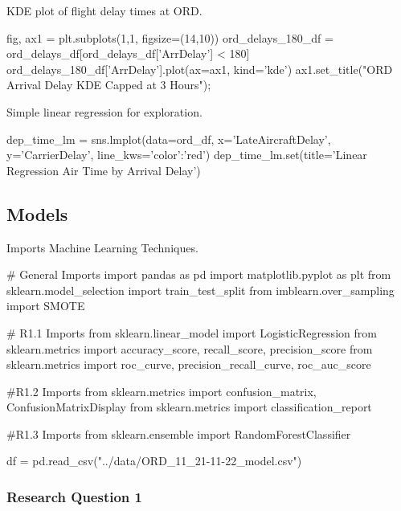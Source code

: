 \documentclass[a4paper,12pt]{article}
\begin{document}
KDE plot of flight delay times at ORD.

\begin{python}

fig, ax1 = plt.subplots(1,1, figsize=(14,10))
ord_delays_180_df = ord_delays_df[ord_delays_df['ArrDelay'] < 180] 
ord_delays_180_df['ArrDelay'].plot(ax=ax1, kind='kde')
ax1.set_title("ORD Arrival Delay KDE Capped at 3 Hours");

\end{python}

Simple linear regression for exploration.

\begin{python}

dep_time_lm = sns.lmplot(data=ord_df, x='LateAircraftDelay', y='CarrierDelay', line_kws={'color':'red'})
dep_time_lm.set(title='Linear Regression Air Time by Arrival Delay')

\end{python}


\subsection{Models}

Imports Machine Learning Techniques.
\begin{python}
# General Imports
import pandas as pd
import matplotlib.pyplot as plt
from sklearn.model_selection import train_test_split
from imblearn.over_sampling import SMOTE

# R1.1 Imports
from sklearn.linear_model import LogisticRegression
from sklearn.metrics import accuracy_score, recall_score, precision_score
from sklearn.metrics import roc_curve, precision_recall_curve, roc_auc_score

#R1.2 Imports
from sklearn.metrics import confusion_matrix, ConfusionMatrixDisplay
from sklearn.metrics import classification_report

#R1.3 Imports
from sklearn.ensemble import RandomForestClassifier

df = pd.read_csv("../data/ORD_11_21-11-22_model.csv")
\end{python}

\subsubsection{Research Question 1} \label{model:rq1_code}
\end{document}
